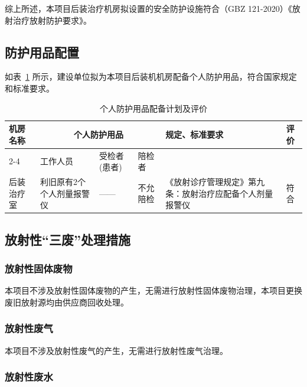综上所述，本项目后装治疗机房拟设置的安全防护设施符合（GBZ 121-2020）《放射治疗放射防护要求》。




\subsection{防护用品配置}

如表~\ref{tab:ch4-ppe} 所示，建设单位拟为本项目后装机机房配备个人防护用品，符合国家规定和标准要求。

\begin{table}[H]
\centering
\caption{个人防护用品配备计划及评价}
\label{tab:ch4-ppe}
\begin{tabular}{|m{2cm}|m{2cm}|m{1.5cm}|m{1.5cm}|m{5cm}|m{1cm}|}
\hline
\multirow{2}{2cm}{\centering 机房名称}
& \multicolumn{3}{c|}{\centering 个人防护用品}
& \multirow{2}{5cm}{\centering 规定、标准要求}
& \multirow{2}{1cm}{\centering 评价} \\
\cline{2-4}
& \centering\arraybackslash 工作人员
& \centering\arraybackslash 受检者(患者)
& \centering\arraybackslash 陪检者
& & \\
\hline
后装治疗室
& 利旧原有2个个人剂量报警仪
& \centering\arraybackslash ——
& \centering\arraybackslash 不允陪检
& 《放射诊疗管理规定》第九条：放射治疗应配备个人剂量报警仪
& \centering\arraybackslash 符合 \\
\hline
\end{tabular}
\end{table}

\subsection{放射性“三废”处理措施}

\subsubsection{放射性固体废物}

本项目不涉及放射性固体废物的产生，无需进行放射性固体废物治理，本项目更换废旧放射源均由供应商回收处理。

\subsubsection{放射性废气}

本项目不涉及放射性废气的产生，无需进行放射性废气治理。

\subsubsection{放射性废水}

